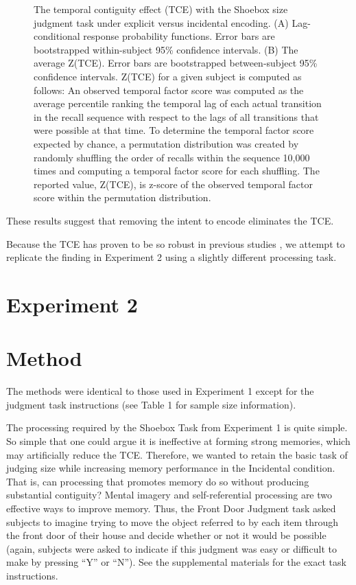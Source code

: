 \documentclass[jou,natbib,floatsintext]{apa6} %
\begin{document}
\newcommand\paneltext{(A) Lag-conditional response probability functions. Error bars are bootstrapped within-subject 95\% confidence intervals. (B) The average Z(TCE).  Error bars are bootstrapped between-subject 95\% confidence intervals. Z(TCE) for a given subject is computed as follows: An observed temporal factor score was computed as the average percentile ranking the temporal lag of each actual transition in the recall sequence with respect to the lags of all transitions that were possible at that time. To determine the temporal factor score expected by chance, a permutation distribution was created by randomly shuffling the order of recalls within the sequence 10,000 times and computing a temporal factor score for each shuffling. The reported value, Z(TCE), is z-score of the observed temporal factor score within the permutation distribution.}
\begin{figure*}
\caption{The temporal contiguity effect (TCE) with the Shoebox size judgment task under explicit versus incidental encoding. \paneltext}
\label{shoebox}
\end{figure*}

These results suggest that removing the intent to encode eliminates the TCE.

Because the TCE has proven to be so robust in previous studies \citep{HealKaha17}, we attempt to replicate the finding in Experiment 2 using a slightly different processing task.

\section{Experiment 2}
\section{Method}

The methods were identical to those used in Experiment 1 except for the judgment task instructions (see Table 1 for sample size information).

The processing required by the Shoebox Task from Experiment 1 is quite simple. So simple that one could argue it is  ineffective at forming strong memories, which may artificially reduce the TCE. Therefore, we wanted to retain the basic task of judging size while increasing memory performance in the Incidental condition. That is, can processing that promotes memory do so without producing substantial contiguity? Mental imagery and self-referential processing are two effective ways to improve memory. Thus, the Front Door Judgment task asked subjects to imagine trying to move the object referred to by each item through the front door of their house and decide whether or not it would be possible (again, subjects were asked to indicate if this judgment was easy or difficult to make by pressing ``Y'' or ``N'').
See the supplemental materials for the exact task instructions.
\end{document}
